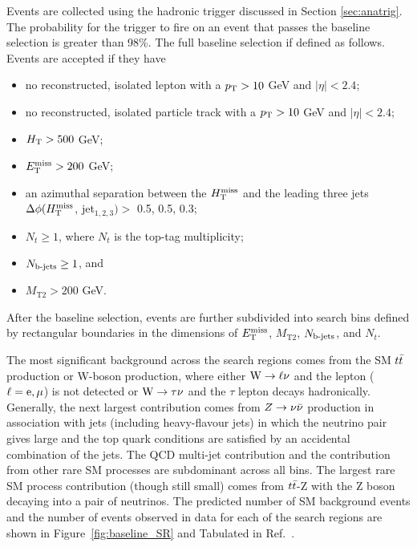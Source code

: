 Events are collected using the hadronic trigger discussed in Section \ref{sec:anatrig}. The probability for the trigger to fire on an event that passes the baseline selection is greater than 98\%. The full baseline selection if defined as follows. Events are accepted if they have
\begin{itemize}
\item no reconstructed, isolated lepton with a $p_{\text{T}}>10$ GeV and $|\eta|<2.4$;
\item no reconstructed, isolated particle track with a $p_{\text{T}}>10$ GeV and $|\eta|<2.4$;
\item $H_{\rm T}>500$ GeV;
\item $E_{\text{T}}^{\rm miss}>200$ GeV;
\item an azimuthal separation between the $H_{\text{T}}^{\rm miss}$ and the leading three jets $\Delta\phi(H_{\text{T}}^{\rm miss}$, jet$_{1,2,3})>$ 0.5, 0.5, 0.3;
\item $N_t\geq1$, where $N_t$ is the top-tag multiplicity;
\item $N_{\text{b-jets}}\geq1$, and
\item $M_{\text{T2}}>200$ GeV.
\end{itemize}
After the baseline selection, events are further subdivided into search bins defined by rectangular boundaries in the dimensions of $E_{\text{T}}^{\rm miss}$, $M_{\text{T2}}$, $N_{\text{b-jets}}$, and $N_t$. 

The most significant background across the search regions comes from the SM $t\bar{t}$ production or W-boson production, where either ${\rm W}\rightarrow \ell\nu$ and the lepton ($\ell={\rm e},\mu$) is not detected or ${\rm W}\rightarrow \tau\nu$ and the $\tau$ lepton decays hadronically. Generally, the next largest contribution comes from $Z\rightarrow \nu\bar{\nu}$ production in association with jets (including heavy-flavour jets) in which the neutrino pair gives large \MET and the top quark conditions are satisfied by an accidental combination of the jets. The QCD multi-jet contribution and the contribution from other rare SM processes are subdominant across all bins. The largest rare SM process contribution (though still small) comes from $t\bar{t}$-Z with the Z boson decaying into a pair of neutrinos.  The predicted number of SM background events and the number of events observed in data for each of the search regions are shown in Figure~\ref{fig:baseline_SR} and Tabulated in Ref.~\cite{CMS:2016nhb}. 

